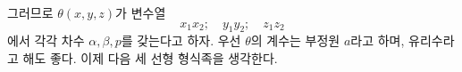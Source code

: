 
그러므로 $\theta(x,y,z)$가 변수열
\[
  x_1x_2;\quad y_1y_2;\quad z_1z_2
\]
에서 각각 차수 $\alpha,\beta,p$를 갖는다고 하자. 우선 $\theta$의 계수는 부정원 $a$라고 하며, 유리수라고 해도 좋다. 이제 다음 세 선형 형식족을 생각한다.
